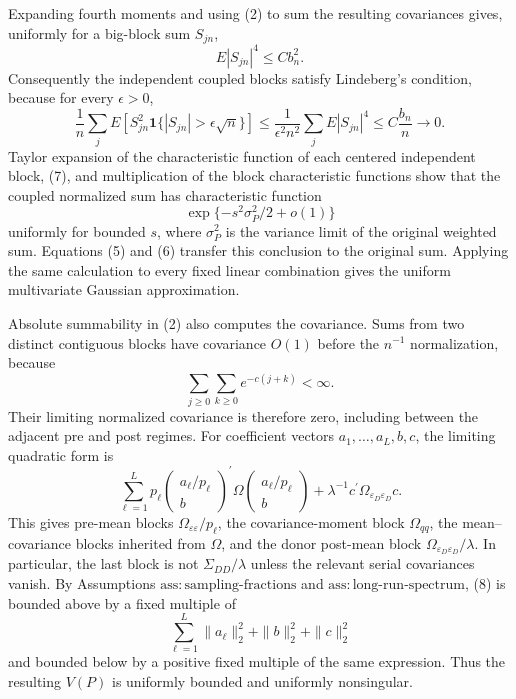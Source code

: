 Expanding fourth moments and using (2) to sum the resulting covariances gives, uniformly for a big-block sum \(S_{jn}\),
\[
E|S_{jn}|^4\leq Cb_n^2.
\]
Consequently the independent coupled blocks satisfy Lindeberg's condition, because for every \(\epsilon>0\),
\[
\frac1n\sum_j
E\!\left[S_{jn}^2
\mathbf 1\{|S_{jn}|>\epsilon\sqrt n\}\right]
\leq\frac1{\epsilon^2n^2}\sum_jE|S_{jn}|^4
\leq C\frac{b_n}{n}\longrightarrow0.
\tag{7}
\]
Taylor expansion of the characteristic function of each centered independent block, (7), and multiplication of the block characteristic functions show that the coupled normalized sum has characteristic function
\[
\exp\{-s^2\sigma_P^2/2+o(1)\}
\]
uniformly for bounded \(s\), where \(\sigma_P^2\) is the variance limit of the original weighted sum.  Equations (5) and (6) transfer this conclusion to the original sum.  Applying the same calculation to every fixed linear combination gives the uniform multivariate Gaussian approximation.

Absolute summability in (2) also computes the covariance.  Sums from two distinct contiguous blocks have covariance \(O(1)\) before the \(n^{-1}\) normalization, because
\[
\sum_{j\geq0}\sum_{k\geq0}e^{-c(j+k)}<\infty.
\]
Their limiting normalized covariance is therefore zero, including between the adjacent pre and post regimes.  For coefficient vectors \(a_1,\ldots,a_L,b,c\), the limiting quadratic form is
\[
\sum_{\ell=1}^{L}p_\ell
\begin{pmatrix}a_\ell/p_\ell\\ b\end{pmatrix}^{\!\prime}
\Omega
\begin{pmatrix}a_\ell/p_\ell\\ b\end{pmatrix}
+\lambda^{-1}c^{\prime}
\Omega_{\varepsilon_D\varepsilon_D}c.
\tag{8}
\]
This gives pre-mean blocks \(\Omega_{\varepsilon\varepsilon}/p_\ell\), the covariance-moment block \(\Omega_{qq}\), the mean--covariance blocks inherited from \(\Omega\), and the donor post-mean block \(\Omega_{\varepsilon_D\varepsilon_D}/\lambda\).  In particular, the last block is not \(\Sigma_{DD}/\lambda\) unless the relevant serial covariances vanish.  By Assumptions \(\mathrm{ass:sampling\mbox{-}fractions}\) and \(\mathrm{ass:long\mbox{-}run\mbox{-}spectrum}\), (8) is bounded above by a fixed multiple of
\[
\sum_{\ell=1}^{L}\|a_\ell\|_2^2+\|b\|_2^2+\|c\|_2^2
\]
and bounded below by a positive fixed multiple of the same expression.  Thus the resulting \(V(P)\) is uniformly bounded and uniformly nonsingular.

